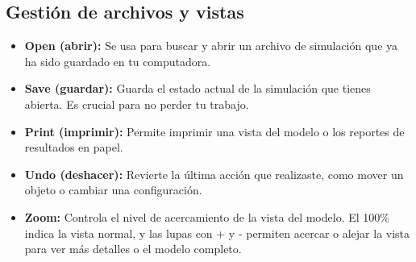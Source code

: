\documentclass[runningheads]{llncs}
\begin{document}
\subsection{Gestión de archivos y vistas}
\begin{itemize}
    \item \textbf{Open (abrir):} Se usa para buscar y abrir un archivo de simulación que ya ha sido guardado en tu computadora.
    \item \textbf{Save (guardar):} Guarda el estado actual de la simulación que tienes abierta. Es crucial para no perder tu trabajo.
    \item \textbf{Print (imprimir):} Permite imprimir una vista del modelo o los reportes de resultados en papel.
    \item \textbf{Undo (deshacer):} Revierte la última acción que realizaste, como mover un objeto o cambiar una configuración.
    \item \textbf{Zoom:} Controla el nivel de acercamiento de la vista del modelo. El 100\% indica la vista normal, y las lupas con + y - permiten acercar o alejar la vista para ver más detalles o el modelo completo.
\end{itemize}
\end{document}
